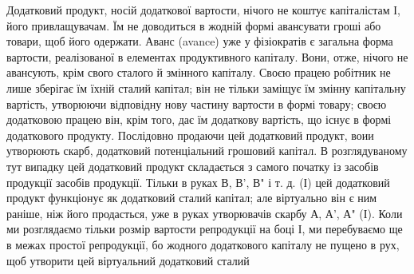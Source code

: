 Додатковий продукт, носій додаткової вартости, нічого не коштує
капіталістам І, його привлащувачам. Їм не доводиться в жодній формі
авансувати гроші або товари, щоб його одержати. Аванс (avance)
уже у фізіократів є загальна форма вартости, реалізованої в елементах
продуктивного капіталу. Вони, отже, нічого не авансують, крім свого сталого
й змінного капіталу. Своєю працею робітник не лише зберігає їм
їхній сталий капітал; він не тільки заміщує їм змінну капітальну вартість,
утворюючи відповідну нову частину вартости в формі товару; своєю додатковою
працею він, крім того, дає їм додаткову вартість, що існує
в формі додаткового продукту. Послідовно продаючи цей додатковий
продукт, воии утворюють скарб, додатковий потенціальний грошовий капітал.
В розглядуваному тут випадку цей додатковий продукт складається
з самого початку із засобів продукції засобів продукції. Тільки в руках
В, В', В" і т. д. (І) цей додатковий продукт функціонує як додатковий
сталий капітал; але віртуально він є ним раніше, ніж його продасться,
уже в руках утворювачів скарбу А, А', А" (І). Коли ми розглядаємо
тільки розмір вартости репродукції на боці І, ми перебуваємо
ще в межах простої репродукції, бо жодного додаткового капіталу
не пущено в рух, щоб утворити цей віртуальний додатковий сталий
\parbreak{}  %
